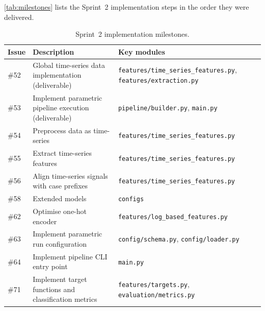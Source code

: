 \documentclass[runningheads]{llncs}
\begin{document}
\autoref{tab:milestones} lists the Sprint~2 implementation steps in the order they were delivered.

\begin{table}[H]
    \centering
    \caption{Sprint~2 implementation milestones.}
    \label{tab:milestones}
    \begin{tabularx}{\textwidth}{lXX}
        \toprule
        \textbf{Issue} & \textbf{Description}                                  & \textbf{Key modules}                                                         \\
        \midrule
        \#52           & Global time-series data implementation (deliverable)  & \texttt{features/time\_series\_features.py}, \texttt{features/extraction.py} \\
        \#53           & Implement parametric pipeline execution (deliverable) & \texttt{pipeline/builder.py}, \texttt{main.py}                               \\
        \#54           & Preprocess data as time-series                        & \texttt{features/time\_series\_features.py}                                  \\
        \#55           & Extract time-series features                          & \texttt{features/time\_series\_features.py}                                  \\
        \#56           & Align time-series signals with case prefixes          & \texttt{features/time\_series\_features.py}                                  \\
        \#58           & Extended models                                       & \texttt{configs}                                                             \\
        \#62           & Optimise one-hot encoder                              & \texttt{features/log\_based\_features.py}                                    \\
        \#63           & Implement parametric run configuration                & \texttt{config/schema.py}, \texttt{config/loader.py}                         \\
        \#64           & Implement pipeline CLI entry point                    & \texttt{main.py}                                                             \\
        \#71           & Implement target functions and classification metrics & \texttt{features/targets.py}, \texttt{evaluation/metrics.py}                 \\
        \bottomrule
    \end{tabularx}
\end{table}
\end{document}

